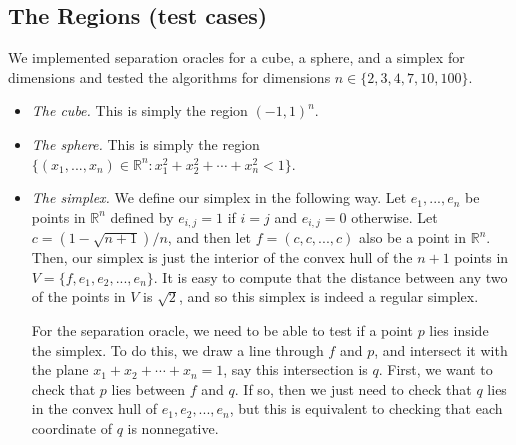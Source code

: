 \documentclass[11pt]{article}
\begin{document}
\subsection{The Regions (test cases)}

We implemented separation oracles for a cube, a sphere, and a simplex for dimensions and tested the algorithms for dimensions $n\in\{2,3,4,7,10,100\}$.
\begin{itemize}
\item \emph{The cube.} This is simply the region $(-1,1)^n$.
\item \emph{The sphere.} This is simply the region $\{(x_1,...,x_n)\in\mathbb{R}^n : x_1^2 + x_2^2 + \cdots + x_n^2 < 1\}$.
\item \emph{The simplex.} We define our simplex in the following way. Let $e_1,...,e_n$ be points in $\mathbb R^n$ defined by $e_{i,j} = 1$ if $i=j$ and $e_{i,j} = 0$ otherwise. Let $c = (1 - \sqrt{n+1}) / n$, and then let $f = (c,c,...,c)$ also be a point in $\mathbb R^n$. Then, our simplex is just the interior of the convex hull of the $n+1$ points in $V = \{f,e_1,e_2,...,e_n\}$. It is easy to compute that the distance between any two of the points in $V$ is $\sqrt{2}$, and so this simplex is indeed a regular simplex.

For the separation oracle, we need to be able to test if a point $p$ lies inside the simplex. To do this, we draw a line through $f$ and $p$, and intersect it with the plane $x_1 + x_2 + \cdots + x_n = 1$, say this intersection is $q$. First, we want to check that $p$ lies between $f$ and $q$. If so, then we just need to check that $q$ lies in the convex hull of $e_1,e_2,...,e_n$, but this is equivalent to checking that each coordinate of $q$ is nonnegative.
\end{itemize}
\end{document}
